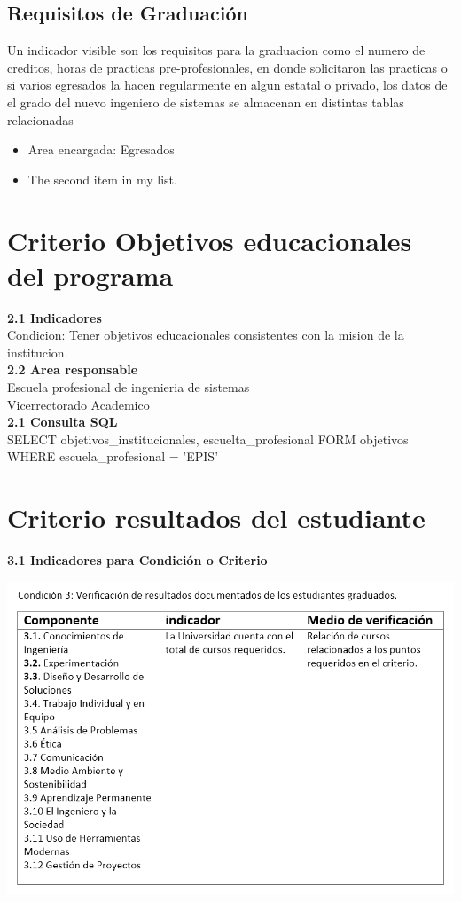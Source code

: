 \documentclass[12pt,a4paper]{report}
\begin{document}
\subsection{Requisitos de Graduación}
Un indicador visible son los requisitos para la graduacion como el numero de creditos, horas de practicas pre-profesionales, en donde solicitaron las practicas o si varios egresados la hacen regularmente en algun estatal o privado, los datos de el grado del nuevo ingeniero de sistemas se almacenan en distintas tablas relacionadas
\begin{itemize}
\item Area encargada: Egresados
\item The second item in my list.
\end{itemize}

\section{ Criterio Objetivos educacionales del programa}
\textbf{2.1 Indicadores }\\

Condicion: Tener objetivos educacionales consistentes con la mision de la institucion.\\

\textbf{2.2 Area responsable}\\

Escuela profesional de ingenieria de sistemas\\
Vicerrectorado Academico\\

\textbf{2.1 Consulta SQL}\\

SELECT objetivos\_institucionales, escuelta\_profesional FORM objetivos WHERE escuela\_profesional = 'EPIS'

\section{ Criterio resultados del estudiante}
\textbf{3.1 Indicadores para Condición o Criterio}
\begin{center}
\includegraphics[width=15cm]{./Images/resultado}
\end{center}	
\end{document}
